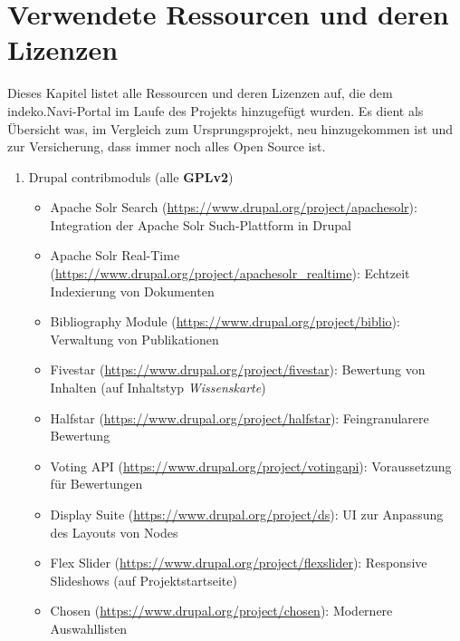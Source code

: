 \newpage
\section{Verwendete Ressourcen und deren Lizenzen}\label{sub:license}
Dieses Kapitel listet alle Ressourcen und deren Lizenzen auf, die dem \acrshort{indeko}.Navi-Portal im Laufe des Projekts hinzugefügt wurden. Es dient als Übersicht was, im Vergleich zum Ursprungsprojekt, neu hinzugekommen ist und zur Versicherung, dass immer noch alles Open Source ist.

\begin{enumerate}[parsep=0pt, itemsep=5.0pt plus 2.0pt minus 1.0pt, leftmargin=*]
	\item Drupal \glspl{contribmodul} (alle \textbf{GPLv2})
	\begin{itemize}
		\item Apache Solr Search (\url{https://www.drupal.org/project/apachesolr}):
		Integration der Apache Solr Such-Plattform in Drupal
		
		\item Apache Solr Real-Time (\url{https://www.drupal.org/project/apachesolr_realtime}):
		Echtzeit Indexierung von Dokumenten
		
		\item Bibliography Module (\url{https://www.drupal.org/project/biblio}):
		Verwaltung von Publikationen
		
		\item Fivestar (\url{https://www.drupal.org/project/fivestar}):
		Bewertung von Inhalten (\zB auf Inhaltstyp \textit{Wissenskarte})
		
		\item Halfstar (\url{https://www.drupal.org/project/halfstar}):
		Feingranularere Bewertung
		
		\item Voting API (\url{https://www.drupal.org/project/votingapi}):
		Voraussetzung für Bewertungen

		\item Display Suite (\url{https://www.drupal.org/project/ds}):
		UI zur Anpassung des Layouts von Nodes
		
		\item Flex Slider (\url{https://www.drupal.org/project/flexslider}):
		Responsive Slideshows (\zB auf Projektstartseite)
		
		\item Chosen (\url{https://www.drupal.org/project/chosen}):
		Modernere Auswahllisten
		

\end{itemize}
\end{enumerate}
